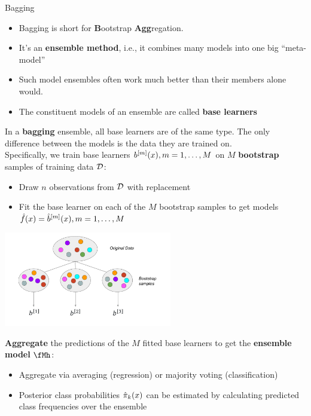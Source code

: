 \begin{vbframe}{Bagging}

\begin{itemize}
  \item Bagging is short for \textbf{B}ootstrap \textbf{Agg}regation.
  \item It's an \textbf{ensemble method}, i.e., it combines many models into one 
        big \enquote{meta-model}
  \item Such model ensembles often work much better than their members alone would.
  \item The constituent models of an ensemble are called \textbf{base learners} 
\end{itemize}

\framebreak 
In a \textbf{bagging} ensemble, all base learners are of the same type. The only difference between the models is the data they are trained on.\\
Specifically, we train base learners $b^{[m]}(x), m = 1, \dots, M$ on $M$ \textbf{bootstrap} samples of training data $\mathcal{D}$:
\begin{itemize}
  \item Draw $n$ observations from $\mathcal{D}$ with replacement
  \item Fit the base learner on each of the $M$ bootstrap samples to get models $\hat{f}(x) = \hat{b}^{[m]}(x), m = 1, \dots, M$
\end{itemize}

\begin{center}
\includegraphics[width=0.55\textwidth]{figure_man/bagging.pdf}
\end{center}

\framebreak

\textbf{Aggregate} the predictions of the $M$ fitted base learners to get the
\textbf{ensemble model} $\fMh$:
  \begin{itemize}
    \item Aggregate via averaging (regression) or majority voting (classification)
    \item Posterior class probabilities $\hat \pi_k(x)$ can be estimated by calculating predicted class frequencies over the ensemble
  \end{itemize}


\end{vbframe}
